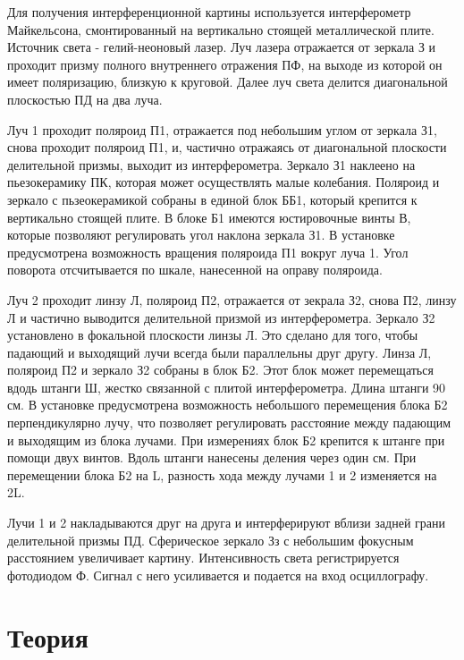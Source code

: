 \documentclass[a4paper, 12pt]{article}
\begin{document}
    Для получения интерференционной картины используется интерферометр Майкельсона, смонтированный на вертикально стоящей металлической плите. Источник света - гелий-неоновый лазер. 
Луч лазера отражается от зеркала З и проходит призму полного внутреннего отражения ПФ, на выходе из которой он имеет поляризацию, близкую к круговой. Далее луч света делится диагональной плоскостью
ПД на два луча.

Луч 1 проходит поляроид П1, отражается под небольшим углом от зеркала З1, снова проходит поляроид П1, и, частично отражаясь от диагональной плоскости делительной призмы, выходит из интерферометра.
Зеркало З1 наклеено на пьезокерамику ПК, которая может осуществлять малые колебания. Поляроид и зеркало с пьзеокерамикой собраны в единой блок ББ1, который крепится к вертикально стоящей плите.
В блоке Б1 имеются юстировочные винты В, которые позволяют регулировать угол наклона зеркала З1. В установке предусмотрена возможность вращения поляроида П1 вокруг луча 1. Угол поворота
отсчитывается по шкале, нанесенной на оправу поляроида.

Луч 2 проходит линзу Л, поляроид П2, отражается от зекрала З2, снова П2, линзу Л и частично выводится делительной призмой из интерферометра. Зеркало З2 установлено в фокальной плоскости линзы
Л. Это сделано для того, чтобы падающий и выходящий лучи всегда были параллельны друг другу. Линза Л, поляроид П2 и зеркало З2 собраны в блок Б2. Этот блок может перемещаться вдодь штанги Ш,
жестко связанной с плитой интерферометра. Длина штанги 90 см. В установке предусмотрена возможность небольшого перемещения блока Б2 перпендикулярно лучу, что позволяет регулировать расстояние между
падающим и выходящим из блока лучами. При измерениях блок Б2 крепится к штанге при помощи двух винтов. Вдоль штанги нанесены деления через один см. При перемещении блока Б2 на L, разность хода 
между лучами 1 и 2 изменяется на 2L.

Лучи 1 и 2 накладываются друг на друга и интерферируют вблизи задней грани делительной призмы ПД. Сферическое зеркало Зз с небольшим фокусным расстоянием увеличивает картину. Интенсивность света
регистрируется фотодиодом Ф. Сигнал с него усиливается и подается на вход осциллографу.

\section{Теория}
\end{document}
